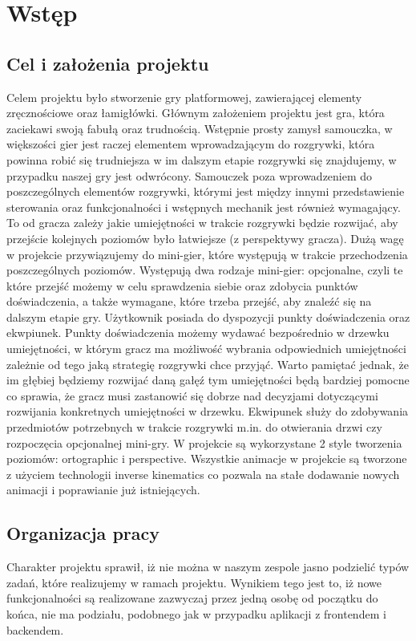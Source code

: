 \documentclass[oneside,polski,logo]{amuthesis}
\begin{document}

\chapter{Wstęp}
\section{Cel i założenia projektu}
Celem projektu było stworzenie gry platformowej, zawierającej elementy zręcznościowe oraz łamigłówki. Głównym założeniem projektu jest gra, która zaciekawi swoją fabułą oraz trudnością. Wstępnie prosty zamysł samouczka, w większości gier jest raczej elementem wprowadzającym do rozgrywki, która powinna robić się trudniejsza w im dalszym etapie rozgrywki się znajdujemy, w przypadku naszej gry jest odwrócony. Samouczek poza wprowadzeniem do poszczególnych elementów rozgrywki, którymi jest między innymi przedstawienie sterowania oraz funkcjonalności i wstępnych mechanik jest również wymagający. To od gracza zależy jakie umiejętności w trakcie rozgrywki będzie rozwijać, aby przejście kolejnych poziomów było łatwiejsze (z perspektywy gracza). Dużą wagę w projekcie przywiązujemy do mini-gier, które występują w trakcie przechodzenia poszczególnych poziomów. Występują dwa rodzaje mini-gier: opcjonalne, czyli te które przejść możemy w celu sprawdzenia siebie oraz zdobycia punktów doświadczenia, a także wymagane, które trzeba przejść, aby znaleźć się na dalszym etapie gry. Użytkownik posiada do dyspozycji punkty doświadczenia oraz ekwpiunek. Punkty doświadczenia możemy wydawać bezpośrednio w drzewku umiejętności, w którym gracz ma możliwość wybrania odpowiednich umiejętności zależnie od tego jaką strategię rozgrywki chce przyjąć. Warto pamiętać jednak, że im głębiej będziemy rozwijać daną gałęź tym umiejętności będą bardziej pomocne co sprawia, że gracz musi zastanowić się dobrze nad decyzjami dotyczącymi rozwijania konkretnych umiejętności w drzewku. Ekwipunek służy do zdobywania przedmiotów potrzebnych w trakcie rozgrywki m.in. do otwierania drzwi czy rozpoczęcia opcjonalnej mini-gry. W projekcie są wykorzystane 2 style tworzenia poziomów: ortographic i perspective. Wszystkie animacje w projekcie są tworzone z użyciem technologii inverse kinematics co pozwala na stałe dodawanie nowych animacji i poprawianie już istniejących.
\section{Organizacja pracy}
Charakter projektu sprawił, iż nie można w naszym zespole jasno podzielić typów zadań, które realizujemy w ramach projektu. Wynikiem tego jest to, iż nowe funkcjonalności są realizowane zazwyczaj przez jedną osobę od początku do końca, nie ma podziału, podobnego jak w przypadku aplikacji z frontendem i backendem.
\end{document}
